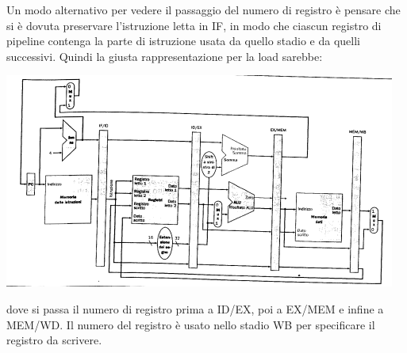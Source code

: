 \documentclass[a4paper,12pt, oneside]{book}
\begin{document}
Un modo alternativo per vedere il passaggio del numero di registro è
pensare che si è dovuta preservare l'istruzione letta in IF, in modo
che ciascun registro di pipeline contenga la parte di istruzione usata
da quello stadio e da quelli successivi. Quindi la giusta
rappresentazione per la load sarebbe:
\begin{center}
  \includegraphics[scale = 0.7]{img/pipe12.png}
\end{center}
dove si passa il numero di registro prima a ID/EX, poi a EX/MEM e
infine a MEM/WD. Il numero del registro è usato nello stadio WB per
specificare il registro da scrivere.
\newpage
\end{document}
